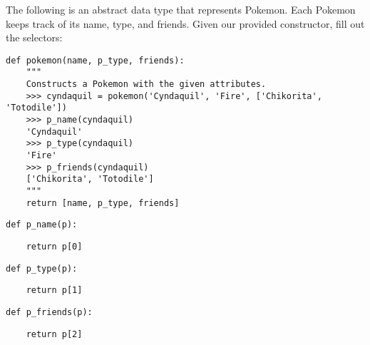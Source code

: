 \begin{blocksection}
    \question The following is an abstract data type that represents Pokemon.
    Each Pokemon keeps track of its name, type, and friends. Given
    our provided constructor, fill out the selectors:
    
    \begin{lstlisting}
def pokemon(name, p_type, friends):
    """
    Constructs a Pokemon with the given attributes. 
    >>> cyndaquil = pokemon('Cyndaquil', 'Fire', ['Chikorita', 'Totodile'])
    >>> p_name(cyndaquil)
    'Cyndaquil'
    >>> p_type(cyndaquil)
    'Fire'
    >>> p_friends(cyndaquil)
    ['Chikorita', 'Totodile']
    """
    return [name, p_type, friends]

    \end{lstlisting}
    
    \end{blocksection}
    \begin{blocksection}
    
    \begin{lstlisting}
def p_name(p):
    \end{lstlisting}
    \begin{solution}[0.25in]
    \begin{lstlisting}
    return p[0]
    \end{lstlisting}
    \end{solution}
    \end{blocksection}
    \begin{blocksection}
    
    \begin{lstlisting}
def p_type(p):
    \end{lstlisting}
    \begin{solution}[0.25in]
    \begin{lstlisting}
    return p[1]
    \end{lstlisting}
    \end{solution}
    \end{blocksection}
    \begin{blocksection}
    
    \begin{lstlisting}
def p_friends(p):
    \end{lstlisting}
    \begin{solution}[0.25in]
    \begin{lstlisting}
    return p[2]
    \end{lstlisting}
    \end{solution}
    \end{blocksection}
    
